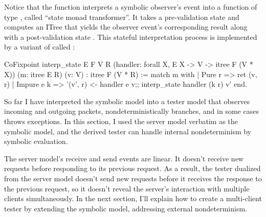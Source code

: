 Notice that the  function interprets a symbolic observer's event
 into a function of type ,
called ``state monad transformer''.  It takes a pre-validation state  and computes an ITree that yields the observer event's corresponding result
 along with a post-validation state .  This stateful
interpretation process is implemented by a variant of  called
:
\begin{coq}
  CoFixpoint interp_state {E F V R}
                          (handler: forall {X}, E X -> V -> itree F (V * X))
                          (m: itree E R) (v: V)
             : itree F (V * R) :=
    match m with
    | Pure   r   => ret (v, r)
    | Impure e k => '(v', r) <- handler e v;;
                    interp_state handler (k r) v'
    end.
\end{coq}

So far I have interpreted the symbolic model into a tester model that observes
incoming and outgoing packets, nondeterministically branches, and in some cases
throws exceptions.  In this section, I used the server model verbatim as the
symbolic model, and the derived tester can handle internal nondeterminism by
symbolic evaluation.

The server model's receive and send events are linear.  It doesn't receive new
requests before responding to its previous request.  As a result, the tester
dualized from the server model doesn't send new requests before it receives the
response to the previous request, so it doesn't reveal the server's interaction
with multiple clients simultaneously.  In the next section, I'll explain how to
create a multi-client tester by extending the symbolic model, addressing
external nondeterminism.
